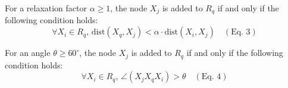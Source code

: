 \begin{defn}[RRND]\label{def:rrnd}
For a relaxation factor \(\alpha \geq 1\), the node \(X_j\) is added to \(R_q\) if and only if the following condition holds:
	\[
	\forall X_i \in R_q, \, \text{dist}\left(X_q, X_j\right) < \alpha \cdot \text{dist}\left(X_i, X_j\right) \quad (\text{Eq. 3})
	\]
\end{defn}

\begin{defn}[MOND]\label{def:mond}
For an angle \(\theta \geq 60^\circ\), the node \(X_j\) is added to \(R_q\) if and only if the following condition holds:
 	\[
	\forall X_i \in R_q, \, \angle\left(X_j X_q X_i\right) > \theta \quad (\text{Eq. 4})
	\]
\end{defn}

